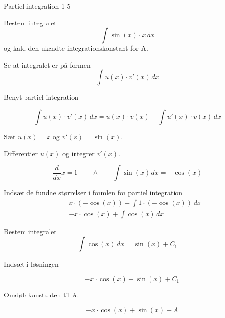 \documentclass{article}
\begin{document}
\newpage

\begin{exercise}{Partiel integration 1-5}
	
	
	Bestem integralet
	\[
	\int \sin(x) \cdot x \, dx
	\]
	og kald den ukendte integrationskonstant for A.
	
	
	
	\hint
	
	Se at integralet er på formen
	\[
	\int u(x) \cdot v'(x) \, dx
	\]
	
	\hint
	
	Benyt partiel integration
	
	\hint
	\[
	\int u(x) \cdot v'(x)\, dx = u(x) \cdot v(x) - \int u'(x) \cdot v(x) \, dx
	\]
	\hint
	
	Sæt $u(x) = x$ og $v'(x) = \sin(x)$.
	
	
	\hint
	
	Differentier $u(x)$ og integrer $v'(x)$.
	
	\hint
	\[
	\frac{d}{dx}x = 1 \qquad \wedge \qquad \int \sin(x) \, dx = -\cos(x)
	\]
	
	\hint
	
	Indsæt de fundne størrelser i formlen for partiel integration
	\begin{align*}
	&= x \cdot (-\cos(x))- \int 1 \cdot (-\cos(x)) \, dx\\ 
	&= -x \cdot \cos(x)+ \int \cos(x) \, dx 
	\end{align*}
	
	\hint
	
	Bestem integralet
	\[
	\int \cos(x) \, dx = \sin(x) + C_1
	\]
	
	\hint
	Indsæt i løsningen 
	
	\hint
	
	\[
	= -x \cdot \cos(x) + \sin(x) + C_1
	\]
	
	\hint
	
	Omdøb konstanten til A.
	
	\hint
	
	\[
	= -x \cdot \cos(x) + \sin(x) + A
	\]
	
	
\end{exercise}

\newpage
\end{document}

